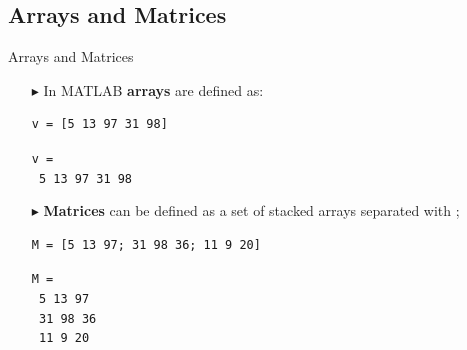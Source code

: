 \documentclass[aspectratio=169]{beamer}
\begin{document}
\subsection{Arrays and Matrices}
\begin{frame}[fragile]{Arrays and Matrices}
    \begin{itemize}
        \item[$\blacktriangleright$]
        In MATLAB \textbf{arrays} are defined as:
        \begin{verbatim}
v = [5 13 97 31 98]
        \end{verbatim}
        \texttt{v =} \\
        \texttt{\hspace{3em} 5 \hspace{3em} 13 \hspace{3em} 97 \hspace{3em} 31 \hspace{3em} 98}

        \item[$\blacktriangleright$]
        \textbf{Matrices} can be defined as a set of stacked arrays separated with ;
        \begin{verbatim}
M = [5 13 97; 31 98 36; 11 9 20]
        \end{verbatim}
        \vspace{2mm}
        \texttt{M =} \\
        \texttt{\hspace{3em} 5 \hspace{3em} 13 \hspace{3em} 97} \\
        \texttt{\hspace{3em} 31 \hspace{3em}98 \hspace{3em} 36} \\
        \texttt{\hspace{3em} 11 \hspace{3em} 9 \hspace{3em} 20}
    \end{itemize}
\end{frame}
\end{document}
